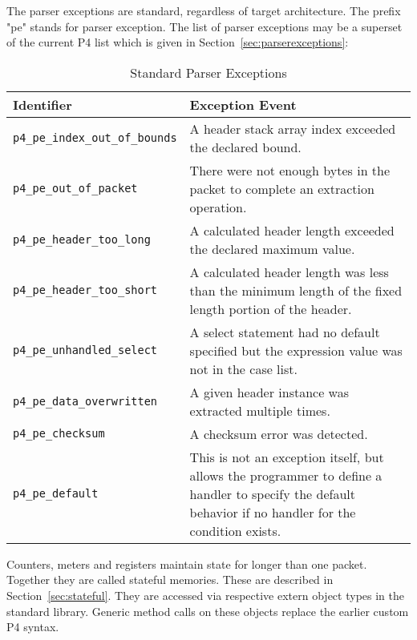 \documentclass[12pt]{article}
\begin{document}
The parser exceptions are standard, regardless of target architecture.
The prefix "pe" stands for parser exception.  The list of parser
exceptions may be a superset of the current P4 list which
is given in Section~\ref{sec:parserexceptions}:

\begin{table}[H]
\begin{center}
\begin{tabular}{| l | p{} |} \hline
\textbf{Identifier} &
\textbf{Exception Event} \\ \hline
\texttt{p4_pe_index_out_of_bounds} &
A header stack array index exceeded the declared bound. \\ \hline
\texttt{p4_pe_out_of_packet} &
There were not enough bytes in the packet to complete an extraction operation. \\ \hline
\texttt{p4_pe_header_too_long} &
A calculated header length exceeded the declared maximum value. \\ \hline
\texttt{p4_pe_header_too_short} &
A calculated header length was less than the minimum length of the fixed length 
portion of the header. \\ \hline
\texttt{p4_pe_unhandled_select} &
A select statement had no default specified but the expression value was not 
in the case list. \\ \hline
\texttt{p4_pe_data_overwritten} &
A given header instance was extracted multiple times. \\ \hline
\texttt{p4_pe_checksum} &
A checksum error was detected. \\ \hline
\texttt{p4_pe_default} &
This is not an exception itself, but allows the programmer to define a handler 
to specify the default behavior if no handler for the condition exists. \\
\hline
\end{tabular}
\end{center}
\caption{Standard Parser Exceptions}
\label{tab:parserexceptions}
\end{table}


Counters, meters and registers maintain state for longer than one packet. 
Together they are called stateful memories.  These are described in
Section~\ref{sec:stateful}.  They are accessed via respective extern
object types in the standard library.  Generic method calls on these objects
replace the earlier custom P4 syntax.
\end{document}
